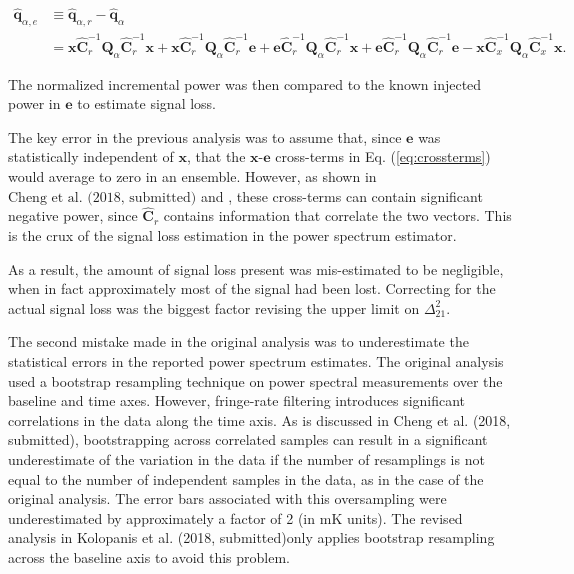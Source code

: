 \documentclass[onecolumn]{emulateapj} \shorttitle{}
\newcommand{\kolopaniscitet}{Kolopanis et al. (2018, submitted)}
\newcommand{\chengcitet}{\textrm{Cheng et al. (2018, submitted)}}
\begin{document}
\begin{align}
{\widehat{\textbf{q}}}_{\alpha,e}&\equiv{\widehat{\textbf{q}}}_{\alpha,r}-{\widehat{\textbf{q}}}_{\alpha} \\
&=
{\mathbf x}\widehat{\textbf{C}}_r^{-1}\textbf{Q}_\alpha \widehat{\textbf{C}}_r^{-1}{\mathbf x}+
{\mathbf x}\widehat{\textbf{C}}_r^{-1}\textbf{Q}_\alpha \widehat{\textbf{C}}_r^{-1}{\mathbf e}+
{\mathbf e}\widehat{\textbf{C}}_r^{-1}\textbf{Q}_\alpha \widehat{\textbf{C}}_r^{-1}{\mathbf x}+
{\mathbf e}\widehat{\textbf{C}}_r^{-1}\textbf{Q}_\alpha \widehat{\textbf{C}}_r^{-1}{\mathbf e}
- {\mathbf x}\widehat{\textbf{C}}_x^{-1}\textbf{Q}_\alpha \widehat{\textbf{C}}_x^{-1}{\mathbf x}.
\label{eq:crossterms}
\end{align}

\noindent The normalized incremental power was then compared to the known injected power in $\mathbf{e}$ to estimate signal loss.

The key error in the previous analysis was to assume that, since $\mathbf e$ was statistically independent of $\mathbf x$, that
the $\mathbf x$-$\mathbf e$ cross-terms in Eq. (\ref{eq:crossterms}) would
average to zero in an ensemble. 
However, as shown in $\chengcitet$ and \citet{switzer_et_al2015}, these cross-terms can contain
significant negative power, since $\widehat{\textbf{C}}_r$ contains information
that correlate the two vectors. This is the crux of the signal loss estimation in the power spectrum estimator.

As a result, the amount of signal loss present was mis-estimated to be negligible, when in fact approximately
most of the signal had been lost. Correcting for the actual signal loss was the biggest factor revising the upper limit
on $\Delta^2_{21}$.

The second mistake made in the original analysis was to underestimate the statistical errors in the reported power spectrum
estimates.  The original analysis used a bootstrap resampling technique on power spectral measurements over the baseline and time axes.
However, fringe-rate filtering introduces significant correlations in the data
along the time axis.  As is discussed in \chengcitet, bootstrapping across correlated samples can result in a significant underestimate
of the variation in the data if the number of resamplings is not equal to the number of independent samples in the data, as in the case 
of the original analysis. The error bars associated with this oversampling were underestimated by approximately a factor of 2 (in $\textrm{mK}$ units).
The revised analysis in \kolopaniscitet only applies bootstrap resampling across the baseline axis to avoid this problem.
\end{document}
